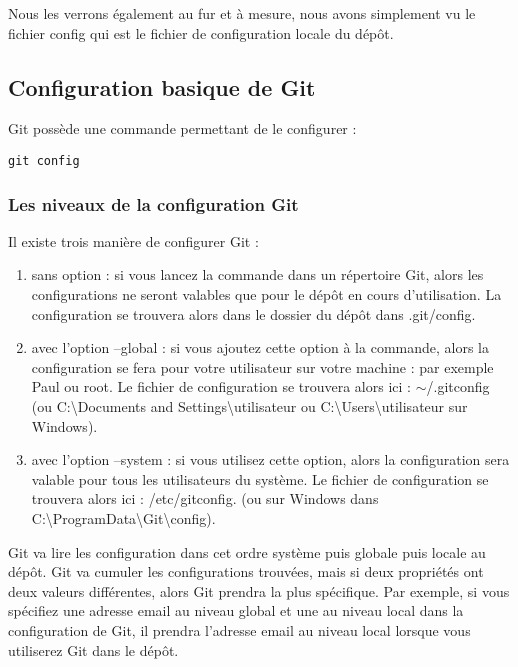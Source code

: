 \documentclass{article}
\begin{document}
Nous les verrons également au fur et à mesure, nous avons simplement vu le fichier {\color{blue}config} qui est le fichier de configuration locale du dépôt.

\subsection{Configuration basique de {\color{blue}Git}}
{\color{blue}Git} possède une commande permettant de le configurer :

\begin{verbatim}
git config
\end{verbatim}

\subsubsection*{Les niveaux de la configuration {\color{blue}Git}}
Il existe trois manière de configurer {\color{blue}Git} :

\begin{enumerate}
\item  sans option : si vous lancez la commande dans un répertoire {\color{blue}Git}, alors les configurations ne seront valables que pour le dépôt en cours d'utilisation. La configuration se trouvera alors dans le dossier du dépôt dans {\color{blue}.git/config}.

\item   avec l'option {\color{blue}--global} : si vous ajoutez cette option à la commande, alors la configuration se fera pour votre utilisateur sur votre machine : par exemple {\color{blue}Paul} ou {\color{blue}root}. Le fichier de configuration se trouvera alors ici : {\color{blue}$\sim$/.gitconfig} (ou {\color{blue}C:\textbackslash Documents and Settings\textbackslash utilisateur} ou {\color{blue}C:\textbackslash Users\textbackslash utilisateur} sur {\color{blue}Windows}).

\item   avec l'option {\color{blue}--system} : si vous utilisez cette option, alors la configuration sera valable pour tous les utilisateurs du système. Le fichier de configuration se trouvera alors ici : {\color{blue}/etc/gitconfig}. (ou sur {\color{blue}Windows} dans {\color{blue}C:\textbackslash ProgramData\textbackslash Git\textbackslash config}).
\end{enumerate}


{\color{blue}Git} va lire les configuration dans cet ordre système puis globale puis locale au dépôt. {\color{blue}Git} va cumuler les configurations trouvées, mais si deux propriétés ont deux valeurs différentes, alors {\color{blue}Git} prendra la plus spécifique. Par exemple, si vous spécifiez une adresse email au niveau global et une au niveau local dans la configuration de {\color{blue}Git}, il prendra l'adresse email au niveau local lorsque vous utiliserez {\color{blue}Git} dans le dépôt.
\end{document}
